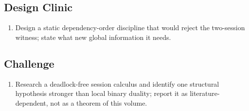 \subsection*{Design Clinic}
\begin{enumerate}[label=\textbf{6.\arabic*},start=11]
\item Design a static dependency-order discipline that would reject the two-session witness; state what new global information it needs.
\end{enumerate}
\subsection*{Challenge}
\begin{enumerate}[label=\textbf{6.\arabic*},start=12]
\item Research a deadlock-free session calculus and identify one structural hypothesis stronger than local binary duality; report it as literature-dependent, not as a theorem of this volume.
\end{enumerate}
